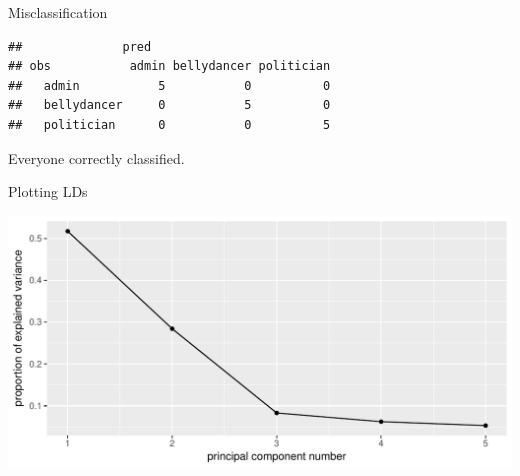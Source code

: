 \begin{frame}[fragile]{Misclassification}
  
\begin{knitrout}
\color{fgcolor}\begin{kframe}
\begin{alltt}
\hlkwb{=}
\hlstd{(}\hlopt{$}\hlopt{$}
\end{alltt}
\begin{verbatim}
##              pred
## obs           admin bellydancer politician
##   admin           5           0          0
##   bellydancer     0           5          0
##   politician      0           0          5
\end{verbatim}
\end{kframe}
\end{knitrout}

Everyone correctly classified.
  
\end{frame}

\begin{frame}[fragile]{Plotting LDs}
  
\begin{knitrout}
\color{fgcolor}\begin{kframe}
\begin{alltt}
\hlkwb{=}\hlstd{(}\hlopt{$}\hlopt{$}\hlstd{=}\hlopt{:}\hlstd{)}
\hlkwb{=}\hlstd{(}
    \hlopt{+}\hlstd{()}\hlopt{+}
    \hlstd{()}\hlopt{+}\hlstd{(}
\end{alltt}
\end{kframe}
\includegraphics[width=\maxwidth]{figure/unnamed-chunk-20-1} 

\end{knitrout}
  
\end{frame}

